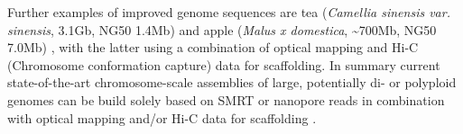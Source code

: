 Further examples of improved genome sequences are tea (\textit{Camellia sinensis var. sinensis}, 3.1Gb, NG50 1.4Mb) \cite{Wei2018}  and apple (\textit{Malus x domestica}, \textasciitilde700Mb, NG50 7.0Mb) \cite{Zhang2019}, with the latter using a combination of optical mapping and Hi-C (Chromosome conformation capture) data for scaffolding.
In summary current state-of-the-art chromosome-scale assemblies of large, potentially di- or polyploid genomes can be build solely based on SMRT or nanopore reads in combination with optical mapping and/or Hi-C data for scaffolding \cite{Belser2018}.


